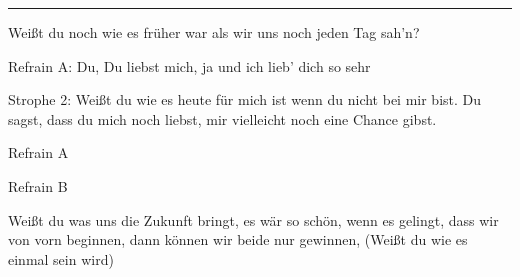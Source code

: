 \noindent\rule{\columnwidth}{1pt}

\begin{lstsong}
Weißt du noch wie es früher war
als wir uns noch jeden Tag sah'n?

Refrain A:
Du, Du liebst mich, ja
und ich lieb' dich
so sehr

Strophe 2:
Weißt du wie es heute für mich ist
wenn du nicht bei mir bist.
Du sagst, dass du mich noch liebst,
mir vielleicht noch eine Chance gibst.

Refrain A

Refrain B

Weißt du was uns die Zukunft bringt,
es wär so schön, wenn es gelingt,
dass wir von vorn beginnen,
dann können wir beide nur gewinnen,
(Weißt du wie es einmal sein wird)
\end{lstsong}
\newpage




